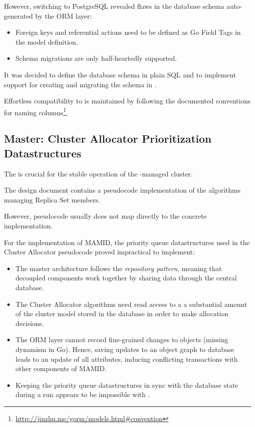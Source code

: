 However, switching to PostgreSQL revealed flaws in the database schema auto-generated by the  ORM layer:

\begin{itemize}
\item Foreign keys and referential actions need to be defined as Go Field Tags in the model definition.
\item Schema migrations are only half-heartedly supported.
\end{itemize}

It was decided to define the database schema in plain SQL and to implement support for creating and migrating the schema in \mamid. %

Effortless compatibility to  is maintained by following the documented conventions for naming 
columns\footnote{\url{http://jinzhu.me/gorm/models.html\#convention}}.

\subsection{Master: Cluster Allocator Prioritization Datastructures}

The  is crucial for the stable operation of the \mamid-managed cluster.

The design document contains a pseudocode implementation of the  algorithms managing Replica Set members.

However, pseudocode usually does not map directly to the concrete implementation.

For the implementation of MAMID, the priority queue datastructures used in the Cluster Allocator pseudocode proved impractical to implement:

\begin{itemize}
\item The master architecture follows the \textit{repository pattern}, meaning that decoupled components work together by sharing data
through the central database.
\item The Cluster Allocator algorithms need read access to a a substantial amount of the cluster model stored in the database
      in order to make allocation decisions.
\item The  ORM layer cannot record fine-grained changes to objects (missing dynamism in Go).
      Hence, saving updates to an object graph to database leads to an update of all attributes,
      inducing conflicting transactions with other components of MAMID.
\item Keeping the priority queue datastructures in sync with the database state during a  run
      appears to be impossible with .
\end{itemize}

